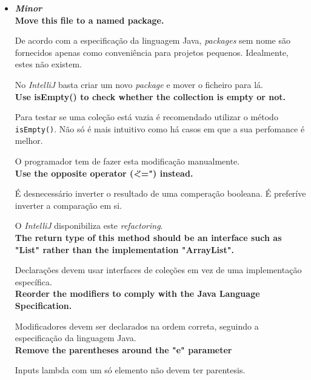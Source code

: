 \documentclass[a4paper]{report}
\begin{document}
\begin{itemize}
    
    \item \textit{\textbf{Minor}}\\
    \textbf{Move this file to a named package.}
    
    De acordo com a especificação da linguagem Java, \textit{packages} sem nome são fornecidos apenas como conveniência para projetos pequenos. Idealmente, estes não existem.
    
    No \textit{IntelliJ} basta criar um novo \textit{package} e mover o ficheiro para lá.\\
    
    \textbf{Use isEmpty() to check whether the collection is empty or not.}
    
    Para testar se uma coleção está vazia é recomendado utilizar o método \texttt{isEmpty()}. Não só é mais intuitivo como há casos em que a sua perfomance é melhor.
    
    O programador tem de fazer esta modificação manualmente.\\
    
    \textbf{Use the opposite operator (\"<=") instead.}
    
    É desnecessário inverter o resultado de uma comperação booleana. É preferíve inverter a comparação em si.
    
    O \textit{IntelliJ} disponibiliza este \textit{refactoring}.\\
    
    \textbf{The return type of this method should be an interface such as "List" rather than the implementation "ArrayList".}
    
    Declarações devem usar interfaces de coleções em vez de uma implementação específica.\\
    
    \textbf{Reorder the modifiers to comply with the Java Language Specification.}
    
    Modificadores devem ser declarados na ordem correta, seguindo a especificação da linguagem Java.\\
    
    \textbf{Remove the parentheses around the "e" parameter}
    
    Inputs lambda com um só elemento não devem ter parentesis.\\
\end{itemize}
\end{document}

